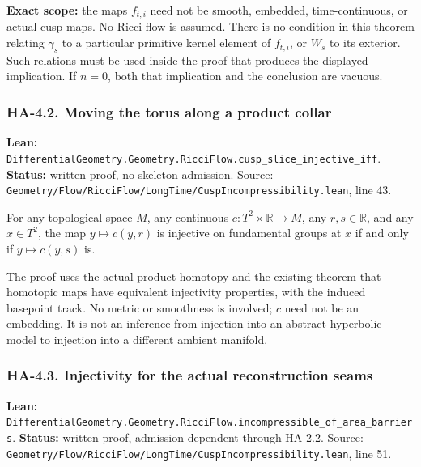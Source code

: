 \documentclass[
  letterpaper,
  11pt]{article}
\begin{document}
\textbf{Exact scope:} the maps \(f_{t,i}\) need not be smooth, embedded,
time-continuous, or actual cusp maps. No Ricci flow is assumed. There is
no condition in this theorem relating \(\gamma_s\) to a particular
primitive kernel element of \(f_{t,i}\), or \(W_s\) to its exterior.
Such relations must be used inside the proof that produces the displayed
implication. If \(n=0\), both that implication and the conclusion are
vacuous.

\subsubsection{HA-4.2. Moving the torus along a product
collar}\label{ha-4-2}

\textbf{Lean:}
{\small\texttt{Differential\allowbreak{}Geometry.\allowbreak{}Geometry.\allowbreak{}Ricci\allowbreak{}Flow.\allowbreak{}cusp\_\allowbreak{}slice\_\allowbreak{}injective\_\allowbreak{}iff}}.
\textbf{Status:} written proof, no skeleton admission. Source:
{\small\texttt{Geometry/\allowbreak{}Flow/\allowbreak{}Ricci\allowbreak{}Flow/\allowbreak{}Long\allowbreak{}Time/\allowbreak{}Cusp\allowbreak{}Incompressibility.\allowbreak{}lean}},
line 43.

For any topological space \(M\), any continuous
\(c:T^2\times\mathbb R\to M\), any \(r,s\in\mathbb R\), and any
\(x\in T^2\), the map \(y\mapsto c(y,r)\) is injective on fundamental
groups at \(x\) if and only if \(y\mapsto c(y,s)\) is.

The proof uses the actual product homotopy and the existing theorem that
homotopic maps have equivalent injectivity properties, with the induced
basepoint track. No metric or smoothness is involved; \(c\) need not be
an embedding. It is not an inference from injection into an abstract
hyperbolic model to injection into a different ambient manifold.

\subsubsection{HA-4.3. Injectivity for the actual reconstruction
seams}\label{ha-4-3}

\textbf{Lean:}
{\small\texttt{Differential\allowbreak{}Geometry.\allowbreak{}Geometry.\allowbreak{}Ricci\allowbreak{}Flow.\allowbreak{}incompressible\_\allowbreak{}of\_\allowbreak{}area\_\allowbreak{}barriers}}.
\textbf{Status:} written proof, admission-dependent through HA-2.2.
Source:
{\small\texttt{Geometry/\allowbreak{}Flow/\allowbreak{}Ricci\allowbreak{}Flow/\allowbreak{}Long\allowbreak{}Time/\allowbreak{}Cusp\allowbreak{}Incompressibility.\allowbreak{}lean}},
line 51.
\end{document}
